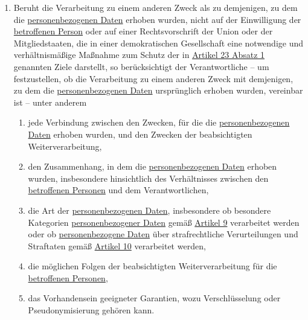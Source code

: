 \begin{enumerate}
  \item Beruht die Verarbeitung zu einem anderen Zweck als zu demjenigen, zu dem die \hyperref[itm:04-1]{personenbezogenen Daten} erhoben
   wurden, nicht auf der Einwilligung der \hyperref[itm:04-1]{betroffenen Person} oder auf einer Rechtsvorschrift der Union oder der
   Mitgliedstaaten, die in einer demokratischen Gesellschaft eine notwendige und verhältnismäßige Maßnahme zum Schutz
   der in \hyperref[itm:23-1]{Artikel 23 Absatz 1} genannten Ziele darstellt, so berücksichtigt der Verantwortliche --
   um festzustellen, ob die Verarbeitung zu einem anderen Zweck mit demjenigen, zu dem die \hyperref[itm:04-1]{personenbezogenen Daten}
   ursprünglich erhoben wurden, vereinbar ist -- unter anderem
  \label{itm:06-4}

  \begin{enumerate}
  
    \item jede Verbindung zwischen den Zwecken, für die die \hyperref[itm:04-1]{personenbezogenen Daten} erhoben wurden, und den Zwecken der
     beabsichtigten Weiterverarbeitung,
    \label{itm:06-4a}

    \item den Zusammenhang, in dem die \hyperref[itm:04-1]{personenbezogenen Daten} erhoben wurden, insbesondere hinsichtlich des
     Verhältnisses zwischen den \hyperref[itm:04-1]{betroffenen Personen} und dem Verantwortlichen,
    \label{itm:06-4b}

    \item die Art der \hyperref[itm:04-1]{personenbezogenen Daten}, insbesondere ob besondere Kategorien \hyperref[itm:04-1]{personenbezogener Daten} gemäß
     \hyperref[ch:9]{Artikel 9} verarbeitet werden oder ob \hyperref[itm:04-1]{personenbezogene Daten} über strafrechtliche Verurteilungen
      und Straftaten gemäß \hyperref[ch:10]{Artikel 10} verarbeitet werden,
    \label{itm:06-4c}

    \item die möglichen Folgen der beabsichtigten Weiterverarbeitung für die \hyperref[itm:04-1]{betroffenen Personen},
    \label{itm:06-4d}

    \item das Vorhandensein geeigneter Garantien, wozu Verschlüsselung oder Pseudonymisierung gehören kann.
    \label{itm:06-4e}

  \end{enumerate}

\end{enumerate}


